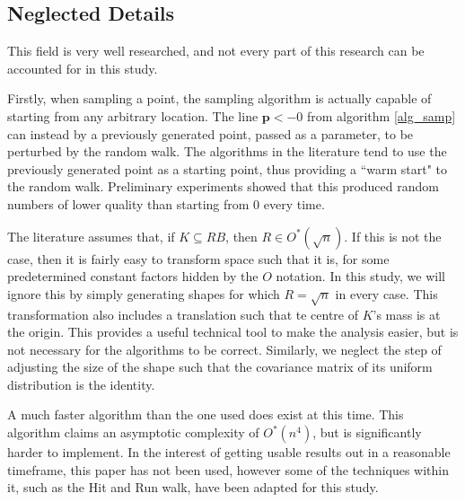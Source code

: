 \subsection{Neglected Details}

This field is very well researched, and not every part of this research can be accounted for in this study.

Firstly, when sampling a point, the sampling algorithm is actually capable of starting from any arbitrary location. The line ${\bm p} <- 0$ from algorithm \ref{alg_samp} can instead by a previously generated point, passed as a parameter, to be perturbed by the random walk. The algorithms in the literature tend to use the previously generated point as a starting point, thus providing a ``warm start" to the random walk. Preliminary experiments showed that this produced random numbers of lower quality than starting from $0$ every time.

The literature assumes that, if $K \subseteq RB$, then $R \in O^{*}(\sqrt{n})$. If this is not the case, then it is fairly easy to transform space such that it is, for some predetermined constant factors hidden by the $O$ notation. In this study, we will ignore this by simply generating shapes for which $R = \sqrt{n}$ in every case. This transformation also includes a translation such that te centre of $K$'s mass is at the origin. This provides a useful technical tool to make the analysis easier, but is not necessary for the algorithms to be correct. Similarly, we neglect the step of adjusting the size of the shape such that the covariance matrix of its uniform distribution is the identity.

A much faster algorithm than the one used does exist at this time\cite{Lovasz03}. This algorithm claims an asymptotic complexity of $O^{*}(n^4)$, but is significantly harder to implement. In the interest of getting usable results out in a reasonable timeframe, this paper has not been used, however some of the techniques within it, such as the Hit and Run walk, have been adapted for this study.